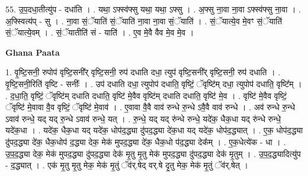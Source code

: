 \documentclass[17pt]{extarticle}
\begin{document}
55. उ॒प॒दधा॒तीत्यु॑प - दधा॑ति । . यथा॒ ऽफ्स्व॑फ्सु यथा॒ यथा॒ ऽफ्सु । . अ॒फ्सु ना॒वा ना॒वा ऽफ्स्व॑फ्सु ना॒वा । . अ॒फ्स्वित्य॑प् - सु । . ना॒वा सं॒ॅयाति॑ सं॒ॅयाति॑ ना॒वा ना॒वा सं॒ॅयाति॑ । . सं॒ॅयात्ये॒व मे॒वꣳ सं॒ॅयाति॑ सं॒ॅयात्ये॒वम् । . सं॒ॅयातीति॑ सं - याति॑ । . ए॒व मे॒वै वैव मे॒व मे॒व । \newline

\textbf{Ghana Paata } \newline

1. वृ॒ष्टि॒सनी॒ रुपोप॑ वृष्टि॒सनी᳚र् वृष्टि॒सनी॒ रुप॑ दधाति दधा॒ त्युप॑ वृष्टि॒सनी᳚र् वृष्टि॒सनी॒ रुप॑ दधाति । . वृ॒ष्टि॒सनी॒रिति॑ वृष्टि - सनीः᳚ । . उप॑ दधाति दधा॒ त्युपोप॑ दधाति॒ वृष्टिं॒ ॅवृष्टि॑म् दधा॒ त्युपोप॑ दधाति॒ वृष्टि᳚म् । . द॒धा॒ति॒ वृष्टिं॒ ॅवृष्टि॑म् दधाति दधाति॒ वृष्टि॑ मे॒वैव वृष्टि॑म् दधाति दधाति॒ वृष्टि॑ मे॒व । . वृष्टि॑ मे॒वैव वृष्टिं॒ ॅवृष्टि॑ मे॒वावा वै॒व वृष्टिं॒ ॅवृष्टि॑ मे॒वाव॑ । . ए॒वावा वै॒वै वाव॑ रुन्धे रु॒न्धे ऽवै॒वै वाव॑ रुन्धे । . अव॑ रुन्धे रु॒न्धे ऽवाव॑ रुन्धे॒ यद् यद् रु॒न्धे ऽवाव॑ रुन्धे॒ यत् । . रु॒न्धे॒ यद् यद् रु॑न्धे रुन्धे॒ यदे॑क॒ धैक॒धा यद् रु॑न्धे रुन्धे॒ यदे॑क॒धा । . यदे॑क॒ धैक॒धा यद् यदे॑क॒ धोप॑द॒द्ध्या दु॑पद॒द्ध्या दे॑क॒धा यद् यदे॑क॒ धोप॑द॒द्ध्यात् । . ए॒क॒ धोप॑द॒द्ध्या दु॑पद॒द्ध्या दे॑क॒ धैक॒धोप॑ द॒द्ध्या देक॒ मेक॑ मुपद॒द्ध्या दे॑क॒ धैक॒धो प॑द॒द्ध्या देक᳚म् । . ए॒क॒धेत्ये॑क - धा । . उ॒प॒द॒द्ध्या देक॒ मेक॑ मुपद॒द्ध्या दु॑पद॒द्ध्या देक॑ मृ॒तु मृ॒तु मेक॑ मुपद॒द्ध्या दु॑पद॒द्ध्या देक॑ मृ॒तुम् । . उ॒प॒द॒द्ध्यादित्यु॑प - द॒द्ध्यात् । . एक॑ मृ॒तु मृ॒तु मेक॒ मेक॑ मृ॒तुं ॅव॑र्.षेद् वर्.षे दृ॒तु मेक॒ मेक॑ मृ॒तुं ॅव॑र्.षेत् । \newline
\end{document}
